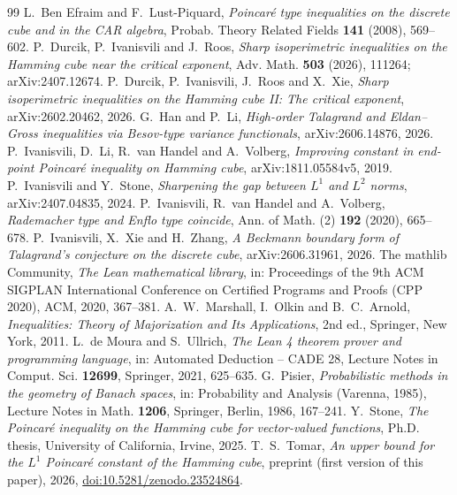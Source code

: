 \documentclass[11pt]{amsart}
\theoremstyle{remark}
\numberwithin{equation}{section}
\begin{document}
\begin{thebibliography}{99}
 L.~Ben Efraim and F.~Lust-Piquard, \emph{Poincar\'e type inequalities on the discrete cube and in the CAR algebra}, Probab. Theory Related Fields \textbf{141} (2008), 569--602.
 P.~Durcik, P.~Ivanisvili and J.~Roos, \emph{Sharp isoperimetric inequalities on the Hamming cube near the critical exponent}, Adv. Math. \textbf{503} (2026), 111264; arXiv:2407.12674.
 P.~Durcik, P.~Ivanisvili, J.~Roos and X.~Xie, \emph{Sharp isoperimetric inequalities on the Hamming cube II: The critical exponent}, arXiv:2602.20462, 2026.
 G.~Han and P.~Li, \emph{High-order Talagrand and Eldan--Gross inequalities via Besov-type variance functionals}, arXiv:2606.14876, 2026.
 P.~Ivanisvili, D.~Li, R.~van Handel and A.~Volberg, \emph{Improving constant in end-point Poincar\'e inequality on Hamming cube}, arXiv:1811.05584v5, 2019.
 P.~Ivanisvili and Y.~Stone, \emph{Sharpening the gap between $L^1$ and $L^2$ norms}, arXiv:2407.04835, 2024.
 P.~Ivanisvili, R.~van Handel and A.~Volberg, \emph{Rademacher type and Enflo type coincide}, Ann. of Math. (2) \textbf{192} (2020), 665--678.
 P.~Ivanisvili, X.~Xie and H.~Zhang, \emph{A Beckmann boundary form of Talagrand's conjecture on the discrete cube}, arXiv:2606.31961, 2026.
 The mathlib Community, \emph{The Lean mathematical library}, in: Proceedings of the 9th ACM SIGPLAN International Conference on Certified Programs and Proofs (CPP 2020), ACM, 2020, 367--381.
 A.~W.~Marshall, I.~Olkin and B.~C.~Arnold, \emph{Inequalities: Theory of Majorization and Its Applications}, 2nd ed., Springer, New York, 2011.
 L.~de Moura and S.~Ullrich, \emph{The Lean 4 theorem prover and programming language}, in: Automated Deduction -- CADE 28, Lecture Notes in Comput. Sci. \textbf{12699}, Springer, 2021, 625--635.
 G.~Pisier, \emph{Probabilistic methods in the geometry of Banach spaces}, in: Probability and Analysis (Varenna, 1985), Lecture Notes in Math. \textbf{1206}, Springer, Berlin, 1986, 167--241.
 Y.~Stone, \emph{The Poincar\'e inequality on the Hamming cube for vector-valued functions}, Ph.D. thesis, University of California, Irvine, 2025.
 T.~S.~Tomar, \emph{An upper bound for the $L^1$ Poincar\'e constant of the Hamming cube}, preprint (first version of this paper), 2026, \href{https://doi.org/10.5281/zenodo.23524864}{doi:10.5281/zenodo.23524864}.
\end{thebibliography}
\end{document}

